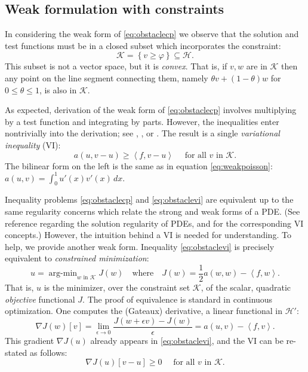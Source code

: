\documentclass[letterpaper,final,12pt,reqno]{amsart}
\theoremstyle{claim}
\newcommand{\eps}{\epsilon}
\newcommand{\grad}{\nabla}
\newcommand{\ip}[2]{\left<#1,#2\right>}
\numberwithin{equation}{section}
\numberwithin{figure}{section}
\numberwithin{table}{section}
\begin{document}
\subsection*{Weak formulation with constraints}  In considering the weak form of \eqref{eq:obstaclecp} we observe that the solution and test functions must be in a closed subset which incorporates the constraint:
\begin{equation}
\mathcal{K} = \left\{v \ge \varphi\right\} \subseteq \mathcal{H}.  \label{eq:Kdefine}
\end{equation}
This subset is not a vector space, but it is \emph{convex}.  That is, if $v,w$ are in $\mathcal{K}$ then any point on the line segment connecting them, namely $\theta v + (1-\theta) w$ for $0 \le \theta \le 1$, is also in $\mathcal{K}$.

As expected, derivation of the weak form of \eqref{eq:obstaclecp} involves multiplying by a test function and integrating by parts.  However, the inequalities enter nontrivially into the derivation; see \cite[Chapter 12]{Bueler2021}, \cite{JouvetBueler2012}, or \cite{KinderlehrerStampacchia1980}.  The result is a single \emph{variational inequality} (VI):
\begin{equation}
  a(u,v-u) \ge \ip{f}{v-u} \quad \text{ for all } v \text{ in } \mathcal{K}. \label{eq:obstaclevi}
\end{equation}
The bilinear form on the left is the same as in equation \eqref{eq:weakpoisson}: $a(u,v) = \int_0^1 u'(x) v'(x)\,dx$.

Inequality problems \eqref{eq:obstaclecp} and \eqref{eq:obstaclevi} are equivalent up to the same regularity concerns which relate the strong and weak forms of a PDE.  (See reference \cite{Evans2010} regarding the solution regularity of PDEs, and \cite{KinderlehrerStampacchia1980} for the corresponding VI concepts.)  However, the intuition behind a VI is needed for understanding.  To help, we provide another weak form.  Inequality \eqref{eq:obstaclevi} is precisely equivalent to \emph{constrained minimization}:
\newcommand{\argmin}{\mathop{\mathrm{arg\text{-}min}}}
\begin{equation}
  u = \argmin_{w \text{ in } \mathcal{K}} J(w) \quad \text{where} \quad J(w) = \frac{1}{2} a(w,w) - \ip{f}{w}. \label{eq:obstaclemin}
\end{equation}
That is, $u$ is the minimizer, over the constraint set $\mathcal{K}$, of the scalar, quadratic \emph{objective} functional $J$.  The proof of equivalence is standard in continuous optimization.  One computes the (Gateaux) derivative, a linear functional in $\mathcal{H}'$:
\begin{equation}
  \grad J(w)[v] = \lim_{\eps\to 0} \frac{J(w+\eps v) - J(w)}{\eps} = a(u,v) - \ip{f}{v}.  \label{eq:gradobjective}
\end{equation}
This gradient $\nabla J(u)$ already appears in \eqref{eq:obstaclevi}, and the VI can be re-stated as follows:
\begin{equation}
  \nabla J(u)[v-u] \ge 0 \quad \text{ for all } v \text{ in } \mathcal{K}. \label{eq:obstaclevigradient}
\end{equation}
\end{document}
